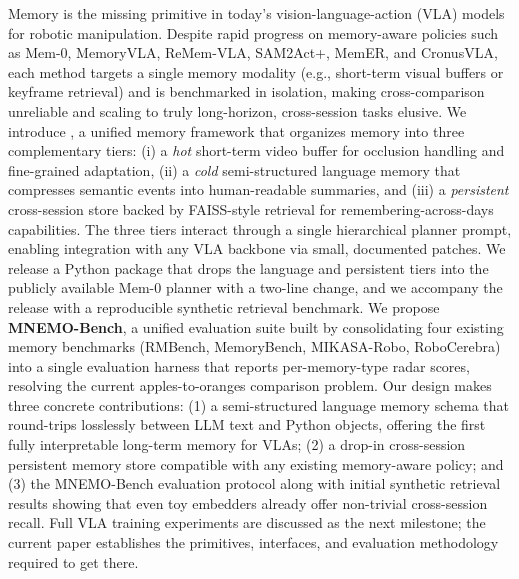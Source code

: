 Memory is the missing primitive in today's vision-language-action (VLA)
models for robotic manipulation. Despite rapid progress on
memory-aware policies such as Mem-0, MemoryVLA, ReMem-VLA, SAM2Act+,
MemER, and CronusVLA, each method targets a single memory modality
(e.g., short-term visual buffers or keyframe retrieval) and is
benchmarked in isolation, making cross-comparison unreliable and
scaling to truly long-horizon, cross-session tasks elusive. We
introduce \method, a unified memory framework that organizes memory
into three complementary tiers: (i) a \emph{hot} short-term video
buffer for occlusion handling and fine-grained adaptation, (ii) a
\emph{cold} semi-structured language memory that compresses semantic
events into human-readable summaries, and (iii) a \emph{persistent}
cross-session store backed by FAISS-style retrieval for
remembering-across-days capabilities. The three tiers interact through
a single hierarchical planner prompt, enabling integration with any
VLA backbone via small, documented patches. We release a Python
package that drops the language and persistent tiers into the
publicly available Mem-0 planner with a two-line change, and we
accompany the release with a reproducible synthetic retrieval
benchmark. We propose \textbf{MNEMO-Bench}, a unified evaluation suite
built by consolidating four existing memory benchmarks
(RMBench, MemoryBench, MIKASA-Robo, RoboCerebra) into a single
evaluation harness that reports per-memory-type radar scores,
resolving the current apples-to-oranges comparison problem. Our
design makes three concrete contributions: (1) a semi-structured
language memory schema that round-trips losslessly between LLM text
and Python objects, offering the first fully interpretable long-term
memory for VLAs; (2) a drop-in cross-session persistent memory store
compatible with any existing memory-aware policy; and (3) the
MNEMO-Bench evaluation protocol along with initial synthetic
retrieval results showing that even toy embedders already offer
non-trivial cross-session recall. Full VLA training experiments are
discussed as the next milestone; the current paper establishes the
primitives, interfaces, and evaluation methodology required to get
there.
